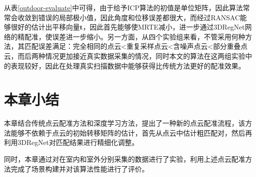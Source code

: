 从表\ref{outdoor-evaluate}中可得，由于给予ICP算法的初值是单位矩阵，因此算法常常会收敛到错误的局部极小值，因此角度和位移误差都很大，而经过RANSAC能够很好的估计出平移向量$\boldsymbol{t}$，因此首先能够使MRTE减小，进一步通过3DRegNet网络的精配准，使误差进一步缩小。另一方面，从四个实验组来看，不管采用何种方法，其匹配误差满足：完全相同的点云<重复采样点云<含噪声点云<部分重叠点云，而后两种情况更加接近真实数据采集的情况，同时本文的算法在这两组实验中的表现较好，因此在处理真实扫描数据中能够获得比传统方法更好的配准效果。

\section{本章小结}
本章结合传统点云配准方法和深度学习方法，提出了一种新的点云配准流程，该方法能够不依赖于点云的初始转移矩阵的估计，首先从点云中估计粗匹配对，然后再利用3DRegNet对匹配结果进行精细化调整。

同时，本章通过对在室内和室外分别采集的数据进行了实验，利用上述点云配准方法完成了场景构建并对该算法性能进行了评价。








